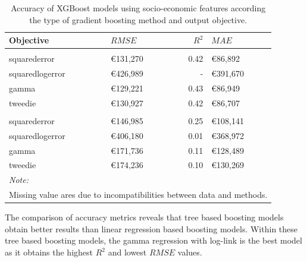 \documentclass[conference,final,]{IEEEtran}
\begin{document}
\begin{table}[H]

\caption{\label{tab:census-model-comparison}Accuracy of XGBoost models using socio-economic features according the type of gradient boosting method and output objective.}
\centering
\fontsize{8}{10}\selectfont
\begin{tabular}[t]{llrl}
\toprule
Objective & $RMSE$ & $R^2$ & $MAE$\\
\midrule
\addlinespace[0.3em]
\multicolumn{4}{l}{\textbf{Tree based}}\\
\hspace{1em}squarederror & €131,270 & 0.42 & €86,892\\
\hspace{1em}squaredlogerror & €426,989 & - & €391,670\\
\hspace{1em}gamma & €129,221 & 0.43 & €86,949\\
\hspace{1em}tweedie & €130,927 & 0.42 & €86,707\\
\addlinespace[0.3em]
\multicolumn{4}{l}{\textbf{Linear regression based}}\\
\hspace{1em}squarederror & €146,985 & 0.25 & €108,141\\
\hspace{1em}squaredlogerror & €406,180 & 0.01 & €368,972\\
\hspace{1em}gamma & €171,736 & 0.11 & €128,489\\
\hspace{1em}tweedie & €174,236 & 0.10 & €130,269\\
\bottomrule
\multicolumn{4}{l}{\textit{Note: }}\\
\multicolumn{4}{l}{Missing value ares due to incompatibilities between data and methods.}\\
\end{tabular}
\end{table}

The comparison of accuracy metrics reveals that tree based boosting models obtain better results than linear regression based boosting models. Within these tree based boosting models, the gamma regression with log-link is the best model as it obtains the highest \(R^2\) and lowest \(RMSE\) values.
\end{document}
